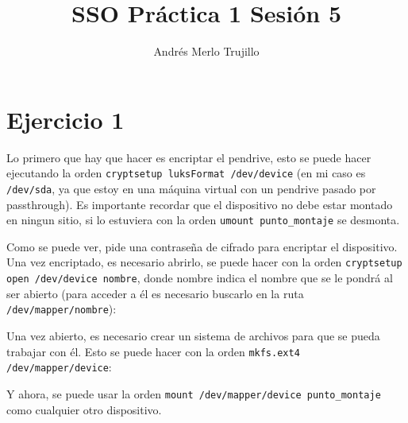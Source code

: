 \documentclass{article}
\title{SSO Práctica 1 Sesión 5}
\author{Andrés Merlo Trujillo}
\date{}
\begin{document}
\maketitle

\tableofcontents

\newpage


\section*{Ejercicio 1}

Lo primero que hay que hacer es encriptar el pendrive, esto se puede hacer ejecutando la orden \verb|cryptsetup luksFormat /dev/device| (en mi caso es \verb|/dev/sda|, ya que estoy en una máquina virtual con un pendrive pasado por passthrough). Es importante recordar que el dispositivo no debe estar montado en ningun sitio, si lo estuviera con la orden \verb|umount punto_montaje| se desmonta.


Como se puede ver, pide una contraseña de cifrado para encriptar el dispositivo. Una vez encriptado, es necesario abrirlo, se puede hacer con la orden \verb|cryptsetup open /dev/device nombre|, donde nombre indica el nombre que se le pondrá al ser abierto (para acceder a él es necesario buscarlo en la ruta \verb|/dev/mapper/nombre|):


Una vez abierto, es necesario crear un sistema de archivos para que se pueda trabajar con él. Esto se puede hacer con la orden \verb|mkfs.ext4 /dev/mapper/device|:


Y ahora, se puede usar la orden \verb|mount /dev/mapper/device punto_montaje| como cualquier otro dispositivo.
\end{document}
